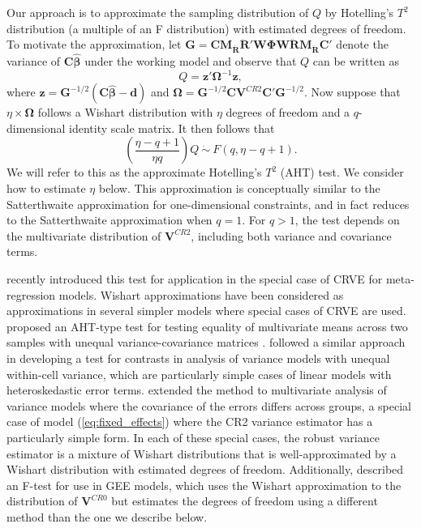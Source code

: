 \documentclass[12pt]{article}\usepackage[]{graphicx}\usepackage[]{color}
\newcommand{\bm}{\mathbf}
\newcommand{\bs}{\boldsymbol}
\begin{document}
Our approach is to approximate the sampling distribution of $Q$ by Hotelling's $T^2$ distribution (a multiple of an F distribution) with estimated degrees of freedom. To motivate the approximation, let $\bm{G} = \bm{C} \bm{M_{\ddot{R}}}\bm{\ddot{R}}'\bm{W}\bs\Phi\bm{W}\bm{\ddot{R}}\bm{M_{\ddot{R}}} \bm{C}'$ denote the variance of $\bm{C}\bs{\hat\beta}$ under the working model and observe that $Q$ can be written as \[
Q = \bm{z}' \bs\Omega^{-1} \bm{z},
\]
where $\bm{z} = \bm{G}^{-1/2}\left(\bm{C}\bs{\hat\beta} - \bm{d}\right)$ and $\bs\Omega = \bm{G}^{-1/2} \bm{C} \bm{V}^{CR2}\bm{C}'\bm{G}^{-1/2}$. 
Now suppose that $\eta \times \bs\Omega$ follows a Wishart distribution with $\eta$ degrees of freedom and a $q$-dimensional identity scale matrix. It then follows that
\begin{equation}
\label{eq:AHT}
\left(\frac{\eta - q + 1}{\eta q}\right) Q \ \dot\sim \ F(q, \eta - q + 1).
\end{equation}
We will refer to this as the approximate Hotelling's $T^2$ (AHT) test.
We consider how to estimate $\eta$ below.
This approximation is conceptually similar to the Satterthwaite approximation for one-dimensional constraints, and in fact reduces to the Satterthwaite approximation when $q = 1$. 
For $q > 1$, the test depends on the multivariate distribution of $\bm{V}^{CR2}$, including both variance and covariance terms. 

\citet{Tipton2015small-F} recently introduced this test for application in the special case of CRVE for meta-regression models.
Wishart approximations have been considered as approximations in several simpler models where special cases of CRVE are used.
\citet{Nel1986solution} proposed an AHT-type test for testing equality of multivariate means across two samples with unequal variance-covariance matrices \citep[i.e., the multivariate Behrens-Fisher problem; see also][]{Krishnamoorthy2004modified}.
\citet{Zhang2012twowayANOVA} followed a similar approach in developing a test for contrasts in analysis of variance models with unequal within-cell variance, which are particularly simple cases of linear models with heteroskedastic error terms. 
\citet{Zhang2012MANOVA} extended the method to multivariate analysis of variance models where the covariance of the errors differs across groups, a special case of model (\ref{eq:fixed_effects}) where the CR2 variance estimator has a particularly simple form. 
In each of these special cases, the robust variance estimator is a mixture of Wishart distributions that is well-approximated by a Wishart distribution with estimated degrees of freedom.
Additionally, \citet{Pan2002small} described an F-test for use in GEE models, which uses the Wishart approximation to the distribution of $\bm{V}^{CR0}$ but estimates the degrees of freedom using a different method than the one we describe below.
\end{document}
